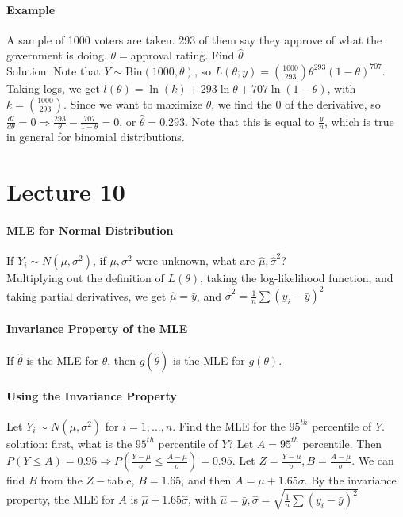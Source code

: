 \documentclass[10pt,letter]{article}
\theoremstyle{plain}
\theoremstyle{definition}
\begin{document}
\paragraph{Example}
A sample of 1000 voters are taken. 293 of them say they approve of what the government is doing. $\theta=$approval rating. Find $\hat{\theta}$ \\ 
Solution: Note that $Y\sim\text{Bin}(1000,\theta)$, so $L(\theta;y)={1000\choose293}\theta^{293}(1-\theta)^{707}$. Taking logs, we get $l(\theta)=\ln(k)+293\ln\theta+707\ln(1-\theta)$, with $k={1000\choose293}$. Since we want to maximize $\theta$, we find the $0$ of the derivative, so $\frac{dl}{d\theta}=0\Rightarrow\frac{293}{\theta}-\frac{707}{1-\theta}=0$, or $\hat\theta=0.293$. Note that this is equal to $\frac{y}{n}$, which is true in general for binomial distributions. 

\section*{Lecture 10}
\paragraph{MLE for Normal Distribution}
If $Y_i\sim N(\mu,\sigma^2)$, if $\mu,\sigma^2$ were unknown, what are $\hat\mu,\hat\sigma^2$? \\ 
Multiplying out the definition of $L(\theta)$, taking the log-likelihood function, and taking partial derivatives, we get $\hat\mu=\bar{y}$, and $\hat\sigma^2=\frac{1}{n}\sum(y_i-\bar{y})^2$
\paragraph{Invariance Property of the MLE}
If $\hat\theta$ is the MLE for $\theta$, then $g(\hat\theta)$ is the MLE for $g(\theta)$. 
\paragraph{Using the Invariance Property}
Let $Y_i\sim N(\mu,\sigma^2)$ for $i=1,\ldots,n$. Find the MLE for the $95^{th}$ percentile of $Y$. \\ 
solution: first, what is the $95^{th}$ percentile of $Y$? Let $A=95^{th}$ percentile. Then $P(Y\leq A)=0.95\Rightarrow P\left(\frac{Y-\mu}{\sigma}\leq\frac{A-\mu}{\sigma}\right)=0.95$. Let $Z=\frac{Y-\mu}{\sigma},B=\frac{A-\mu}{\sigma}$. We can find $B$ from the $Z-$table, $B=1.65$, and then $A=\mu+1.65\sigma$. By the invariance property, the MLE for $A$ is $\hat\mu+1.65\hat\sigma$, with $\hat\mu=\bar{y},\hat\sigma=\sqrt{\frac{1}{n}\sum(y_i-\bar{y})^2}$
\end{document}
